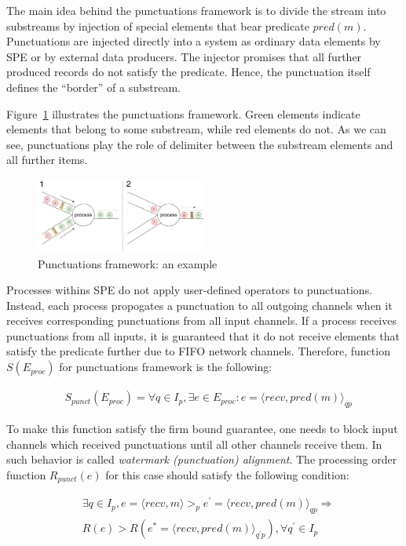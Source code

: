 The main idea behind the punctuations framework is to divide the stream into substreams by injection of special elements that bear predicate $pred(m)$. Punctuations are injected directly into a system as ordinary data elements by SPE or by external data producers. The injector promises that all further produced records do not satisfy the predicate. Hence, the punctuation itself defines the ``border'' of a substream.

Figure~\ref{punctuations_scheme} illustrates the punctuations framework. Green elements indicate elements that belong to some substream, while red elements do not. As we can see, punctuations play the role of delimiter between the substream elements and all further items.

\begin{figure}[htbp]
  \centering
  \includegraphics[width=0.50\textwidth]{pics/punctuations-scheme.pdf}
  \caption{Punctuations framework: an example}
  \label{punctuations_scheme}
\end{figure}

Processes withins SPE do not apply user-defined operators to punctuations. Instead, each process propogates a punctuation to all outgoing channels when it receives corresponding punctuations from all input channels. If a process receives punctuations from all inputs, it is guaranteed that it do not receive elements that satisfy the predicate further due to FIFO network channels. Therefore, function $S(E_{proc})$ for punctuations framework is the following:

\begin{align*}
& S_{punct}(E_{proc}) = \forall q \in I_p, \exists e \in E_{proc} : e = \langle recv,pred(m)\rangle_{qp}
\end{align*}

To make this function satisfy the firm bound guarantee, one needs to block input channels which received punctuations until all other channels receive them. In~\cite{Carbone:2017:SMA:3137765.3137777} such behavior is called {\em watermark (punctuation) alignment}. The processing order function $R_{punct}(e)$ for this case should satisfy the following condition:

\begin{align*}
& \exists q \in I_p, e = \langle recv,m \rangle >_p e^{'} = \langle recv,pred(m)\rangle_{qp} \Longrightarrow \\ 
& R(e) > R(e^{*}= \langle recv,pred(m) \rangle_{q^{'}p}), \forall q^{'} \in I_p
\end{align*}

